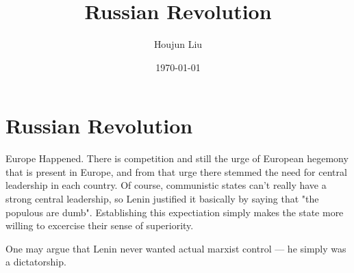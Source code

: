 \documentclass[letterpaper]{article}
\author{Houjun Liu}
\date{\today}
\title{Russian Revolution}
\renewcommand{\tableofcontents}{}
\begin{document}
\tableofcontents



\section{Russian Revolution}
\label{sec:org6db471a}
Europe Happened. There is competition and still the urge of European
hegemony that is present in Europe, and from that urge there stemmed the
need for central leadership in each country. Of course, communistic
states can't really have a strong central leadership, so Lenin justified
it basically by saying that "the populous are dumb". Establishing this
expectiation simply makes the state more willing to excercise their
sense of superiority.

One may argue that Lenin never wanted actual marxist control --- he
simply was a dictatorship.
\end{document}
